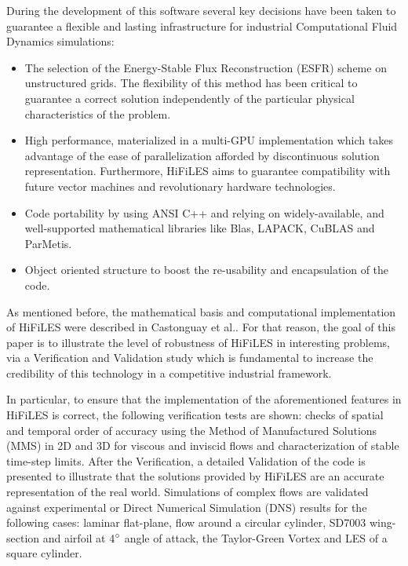 During the development of this software several key decisions have been taken to guarantee a flexible and lasting infrastructure for industrial Computational Fluid Dynamics simulations:
\begin{itemize}
\item The selection of the Energy-Stable Flux Reconstruction (ESFR) scheme on unstructured grids. The flexibility of this method has been critical to guarantee a correct solution independently of the particular physical characteristics of the problem.
\item High performance, materialized in a multi-GPU implementation which takes advantage of the ease of parallelization afforded by discontinuous solution representation. Furthermore, HiFiLES aims to guarantee compatibility with future vector machines and revolutionary hardware technologies.
\item Code portability by using ANSI C++ and relying on widely-available, and well-supported mathematical libraries like Blas, LAPACK, CuBLAS and ParMetis.
\item Object oriented structure to boost the re-usability and encapsulation of the code. %
\end{itemize}

As mentioned before, the mathematical basis and computational implementation of HiFiLES were described in Castonguay et al.\cite{castonguay2011}. For that reason, the goal of this paper is to illustrate the level of robustness of HiFiLES in interesting problems, via a Verification and Validation study which is fundamental to increase the credibility of this technology in a competitive industrial framework.

In particular, to ensure that the implementation of the aforementioned features in HiFiLES is correct, the following verification tests are shown: checks of spatial and temporal order of accuracy using the Method of Manufactured Solutions (MMS) in 2D and 3D for viscous and inviscid flows and characterization of stable time-step limits. After the Verification, a detailed Validation of the code is presented to illustrate that the solutions provided by HiFiLES are an accurate representation of the real world. Simulations of complex flows are validated against experimental or Direct Numerical Simulation (DNS) results for the following cases: laminar flat-plane, flow around a circular cylinder, SD7003 wing-section and airfoil at 4$^{\circ}$ angle of attack, the Taylor-Green Vortex and LES of a square cylinder.


